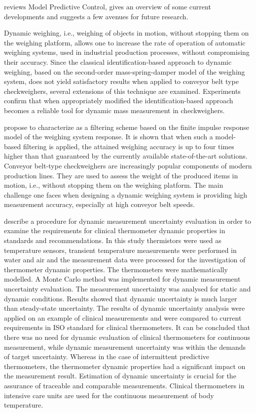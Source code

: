 \documentclass[11pt]{article}
\begin{document}
\citet{Mayne14} reviews Model Predictive Control, gives an overview of some current developments and suggests a few avenues for future research.

\citet{Neuberger07}

\citet{Niedzwiecki16a} Dynamic weighing, i.e., weighing of objects in motion, without stopping them on the weighing platform, allows one to increase the rate of operation of automatic weighing systems, used in industrial production processes, without compromising their accuracy. Since the classical identification-based approach to dynamic weighing, based on the second-order mass-spring-damper model of the weighing system, does not yield satisfactory results when applied to conveyor belt type checkweighers, several extensions of this technique are examined. Experiments confirm that when appropriately modified the identification-based approach becomes a reliable tool for dynamic mass measurement in checkweighers.

\citet{Niedzwiecki16b} propose to characterize as a filtering scheme based on the finite impulse response model of the weighing system response. It is shown that when such a model-based filtering is applied, the attained weighing accuracy is up to four times higher than that guaranteed by the currently available state-of-the-art solutions.
Conveyor belt-type checkweighers are increasingly popular components of modern production lines. They are used to assess the weight of the produced items in motion, i.e., without stopping them on the weighing platform. The main challenge one faces when designing a dynamic weighing system is providing high measurement accuracy, especially at high conveyor belt speeds. 

\citet{Ogorevc16}  describe a procedure for dynamic measurement uncertainty evaluation in order to examine the requirements for clinical thermometer dynamic properties in standards and recommendations. In this study thermistors were used as temperature sensors, transient temperature measurements were performed in water and air and the measurement data were processed for the investigation of thermometer dynamic properties. The thermometers were mathematically modelled. A Monte Carlo method was implemented for dynamic measurement uncertainty evaluation. The measurement uncertainty was analysed for static and dynamic conditions. Results showed that dynamic uncertainty is much larger than steady-state uncertainty. The results of dynamic uncertainty analysis were applied on an example of clinical measurements and were compared to current requirements in ISO standard for clinical thermometers. It can be concluded that there was no need for dynamic evaluation of clinical thermometers for continuous measurement, while dynamic measurement uncertainty was within the demands of target uncertainty. Whereas in the case of intermittent predictive thermometers, the thermometer dynamic properties had a significant impact on the measurement result. Estimation of dynamic uncertainty is crucial for the assurance of traceable and comparable measurements.
Clinical thermometers in intensive care units are used for the continuous measurement of body temperature. 
\end{document}
